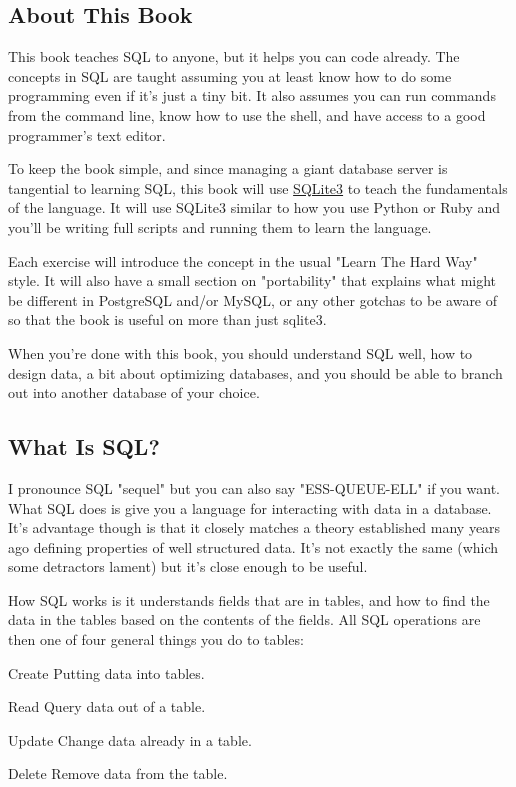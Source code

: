 \subsection*{About This Book}

This book teaches SQL to anyone, but it helps you can code already.  The 
concepts in SQL are taught assuming you at least know how to do some programming
even if it's just a tiny bit.  It also assumes you can run commands from the
command line, know how to use the shell, and have access to a good programmer's
text editor.

To keep the book simple, and since managing a giant database server is tangential
to learning SQL, this book will use \href{http://sqlite.org}{SQLite3} to teach
the fundamentals of the language.  It will use SQLite3 similar to how you use
Python or Ruby and you'll be writing full  scripts and running them
to learn the language.  

Each exercise will introduce the concept in the usual "Learn The Hard Way" style.
It will also have a small section on "portability" that explains what might be
different in PostgreSQL and/or MySQL, or any other gotchas to be aware of so that
the book is useful on more than just sqlite3.

When you're done with this book, you should understand SQL well, how to design
data, a bit about optimizing databases, and you should be able to branch out into
another database of your choice.

\subsection*{What Is SQL?}

I pronounce SQL "sequel" but you can also say "ESS-QUEUE-ELL" if you want. What SQL 
does is give you a language for interacting with data in a database.  It's advantage
though is that it closely matches a theory established many years ago defining properties
of well structured data.  It's not exactly the same (which some detractors lament) but
it's close enough to be useful.

How SQL works is it understands fields that are in tables, and how to find the
data in the tables based on the contents of the fields.  All SQL operations are
then one of four general things you do to tables:

\begin{definition}
\item[Create] Putting data into tables.
\item[Read] Query data out of a table.
\item[Update] Change data already in a table.
\item[Delete] Remove data from the table.
\end{definition}

